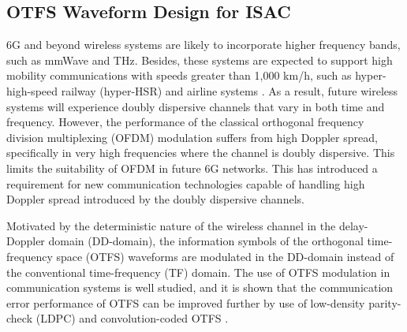 \documentclass[journal, comsoc]{IEEEtran}
\begin{document}
\subsection{OTFS Waveform Design for ISAC}
6G and beyond wireless systems are likely to incorporate higher frequency bands, such as mmWave and THz. Besides, these systems are expected to support  high mobility communications with speeds greater than 1,000 km/h, such as hyper-high-speed railway (hyper-HSR) and airline systems \cite{2921208}. As a result, future wireless systems will experience doubly dispersive channels that vary in both time and frequency. However, the performance of the classical orthogonal frequency division multiplexing (OFDM) modulation suffers from high Doppler spread, specifically in very high frequencies where the channel is doubly dispersive. This limits the suitability of OFDM in future 6G networks. This has introduced a requirement for new communication technologies capable of handling high Doppler spread introduced by the doubly dispersive channels. 

Motivated by the deterministic nature of the wireless channel in the delay-Doppler domain (DD-domain), the information symbols of the orthogonal time-frequency space (OTFS) waveforms are modulated in the DD-domain instead of the conventional time-frequency (TF) domain. The use of OTFS modulation in communication systems is well studied, and it is shown that the communication error performance of OTFS can be improved further by use of low-density parity-check (LDPC) and convolution-coded OTFS \cite{3071493}.  
\end{document}
